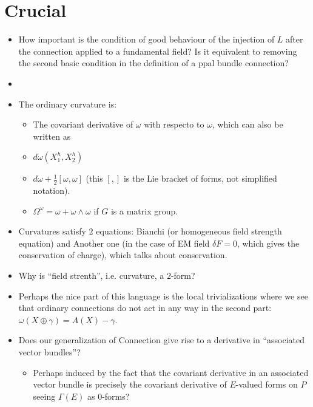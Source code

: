 \section{Crucial}
\begin{itemize}
    \item How important is the condition of good behaviour of the injection of $L$ after the connection applied to a fundamental field? Is it equivalent to removing the second basic condition in the definition of a ppal bundle connection?
    
    \item {}
    
    \item The ordinary curvature is:
    \begin{itemize}
        \item The covariant derivative of $\omega$ with respecto to $\omega$, which can also be written as
        \item $d\omega(X_1^h, X_2^h)$
        \item $d\omega + \frac{1}{2}[\omega,\omega]$ (this $[,]$ is the Lie bracket of forms, not simplified notation).
        \item $\Omega^\omega = \omega + \omega \wedge \omega$ if $G$ is a matrix group.
    \end{itemize}
    
    \item Curvatures satisfy $2$ equations: Bianchi (or homogeneous field strength equation) and Another one (in the case of EM field $\delta F = 0$, which gives the conservation of charge), which talks about conservation.
    
    \item Why is ``field strenth'', i.e. curvature, a $2$-form?
    
    \item Perhaps the nice part of this language is the local trivializations where we see that ordinary connections do not act in any way in the second part: $\omega(X \oplus \gamma) = A(X) - \gamma$.
    
    \item Does our generalization of Connection give rise to a  derivative in ``associated vector bundles''?
    \begin{itemize}
        \item Perhaps induced by the fact that the covariant derivative in an associated vector bundle is precisely the covariant derivative of $E$-valued forms on $P$ seeing $\Gamma(E)$ as $0$-forms?
        

\end{itemize}
\end{itemize}
